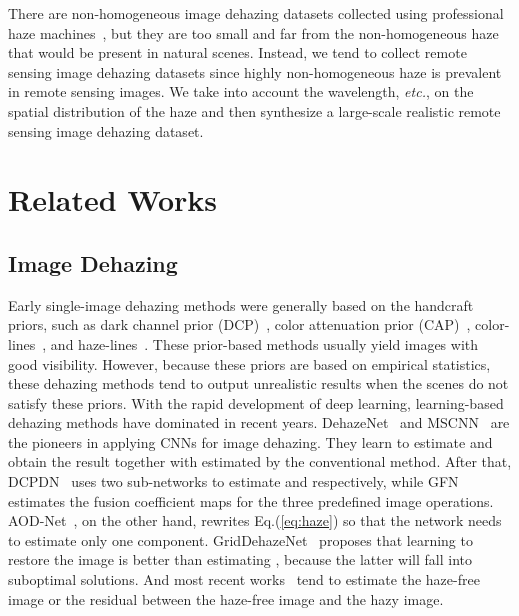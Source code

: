 \documentclass[journal]{IEEEtran}
\begin{document}
There are non-homogeneous image dehazing datasets collected using professional haze machines~\cite{ancuti2020nh}, but they are too small and far from the non-homogeneous haze that would be present in natural scenes.
Instead, we tend to collect remote sensing image dehazing datasets since highly non-homogeneous haze is prevalent in remote sensing images.
We take into account the wavelength, \emph{etc.}, on the spatial distribution of the haze and then synthesize a large-scale realistic remote sensing image dehazing dataset.




 \section{Related Works}

\subsection{Image Dehazing}

Early single-image dehazing methods were generally based on the handcraft priors, such as dark channel prior (DCP)~\cite{he2010single}, color attenuation prior (CAP)~\cite{zhu2015fast}, color-lines~\cite{fattal2014dehazing}, and haze-lines~\cite{berman2016non}.
These prior-based methods usually yield images with good visibility.
However, because these priors are based on empirical statistics, these dehazing methods tend to output unrealistic results when the scenes do not satisfy these priors.
With the rapid development of deep learning, learning-based dehazing methods have dominated in recent years.
DehazeNet~\cite{cai2016dehazenet} and MSCNN~\cite{ren2016single} are the pioneers in applying CNNs for image dehazing.
They learn to estimate  and obtain the result together with  estimated by the conventional method.
After that, DCPDN~\cite{zhang2018densely} uses two sub-networks to estimate  and  respectively, while GFN~\cite{ren2018gated} estimates the fusion coefficient maps for the three predefined image operations.
AOD-Net~\cite{li2017aod}, on the other hand, rewrites Eq.(\ref{eq:haze}) so that the network needs to estimate only one component.
GridDehazeNet~\cite{liu2019griddehazenet} proposes that learning to restore the image is better than estimating , because the latter will fall into suboptimal solutions.
And most recent works~\cite{chen2019gated,dong2020physics,deng2020hardgan,qin2020ffa,dong2020multi,wu2021contrastive,wang2021eaa} tend to estimate the haze-free image or the residual between the haze-free image and the hazy image.
\end{document}
